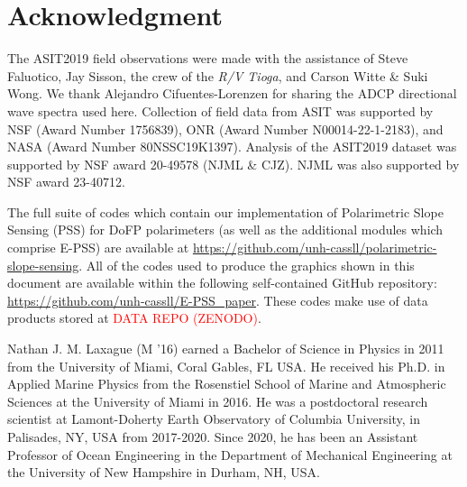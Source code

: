 \documentclass[letterpaper,journal]{IEEEtran}
\begin{document}
\section*{Acknowledgment}

The ASIT2019 field observations were made with the assistance of Steve Faluotico, Jay Sisson, the crew of the \textit{R/V Tioga}, and Carson Witte \& Suki Wong. We thank Alejandro Cifuentes-Lorenzen for sharing the ADCP directional wave spectra used here. Collection of field data from ASIT was supported by NSF (Award Number 1756839), ONR (Award Number N00014-22-1-2183), and NASA (Award Number 80NSSC19K1397). Analysis of the ASIT2019 dataset was supported by NSF award 20-49578 (NJML \& CJZ). NJML was also supported by NSF award 23-40712.

The full suite of codes which contain our implementation of Polarimetric Slope Sensing (PSS) for DoFP polarimeters (as well as the additional modules which comprise E-PSS) are available at \url{https://github.com/unh-cassll/polarimetric-slope-sensing}. All of the codes used to produce the graphics shown in this document are available within the following self-contained GitHub repository: \url{https://github.com/unh-cassll/E-PSS_paper}. These codes make use of data products stored at \textcolor{red}{DATA REPO (ZENODO)}.

\newpage





\begin{IEEEbiography}{Nathan J. M. Laxague}
(M '16) earned a Bachelor of Science in Physics in 2011 from the University of Miami, Coral Gables, FL USA. He received his Ph.D. in Applied Marine Physics from the Rosenstiel School of Marine and Atmospheric Sciences at the University of Miami in 2016. He was a postdoctoral research scientist at Lamont-Doherty Earth Observatory of Columbia University, in Palisades, NY, USA from 2017-2020. Since 2020, he has been an Assistant Professor of Ocean Engineering in the Department of Mechanical Engineering at the University of New Hampshire in Durham, NH, USA.
\end{IEEEbiography}
\end{document}
